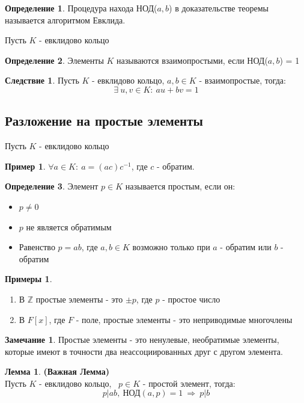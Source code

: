 \documentclass[a4paper, 12pt]{article}
\newcommand{\Z}{\mathbb Z}
\newcommand\tab[1][.5cm]{\hspace*{#1}}
\newcounter{lemcount}
\newcounter{lemcount2}
\theoremstyle{definition}
\newtheorem*{definition}{Определение}
\newtheorem*{consequense}{Следствие}
\newtheorem*{remark}{Замечание}
\newtheorem*{example}{Примеры}
\newtheorem*{example1}{Пример}
\newtheorem{lemmanum}[lemcount]{Лемма}
\begin{document}
  \begin{definition}
    Процедура находа НОД($a,b$) в доказательстве теоремы называется алгоритмом Евклида.
  \end{definition}
  Пусть $K$ - евклидово кольцо
  \begin{definition}
    Элементы $K$ называются взаимопростыми, если НОД($a,b$) = 1  
  \end{definition}
  \begin{consequense}
    Пусть $K$ - евклидово кольцо, $a, b \in K$ - взаимопростые, тогда:
    $$\exists \ u, v \in K: \ au+bv=1$$  
  \end{consequense}
  \subsection{Разложение на простые элементы}
  Пусть $K$ - евклидово кольцо
  \begin{example1}
    $\forall a \in K: \ a = (ac)c^{-1}$, где $c$ - обратим.  
  \end{example1}
  \begin{definition}
    Элемент $p \in K$ называется простым, если он:
    \begin{itemize}
      \item[1)] $p\neq 0$
      \item[2)] $p$ не является обратимым
      \item[3)] Равенство $p = ab$, где $a, b \in K$ возможно только при $a$ - обратим или $b$ - обратим    
    \end{itemize}
  \end{definition}
  \begin{example}\tab
    \begin{enumerate}
      \item В $\Z$ простые элементы - это $\pm p$, где $p$ - простое число
      \item В $F[x]$, где $F$ - поле, простые элементы  - это неприводимые многочлены  
    \end{enumerate}
  \end{example}
  \begin{remark}
  Простые элементы - это ненулевые, необратимые элементы, которые имеют в точности два неассоциированных друг с другом элемента.
  \end{remark}
  \setcounter{lemcount}{0}
  \begin{lemmanum} \textbf{(Важная Лемма)}\\
    Пусть $K$ - евклидово кольцо, \ $p \in K$ - простой элемент, тогда:
    $$p|ab, \ \text{НОД}(a,p) = 1 \ \Longrightarrow \ p|b$$ 
  \end{lemmanum}
\end{document}
